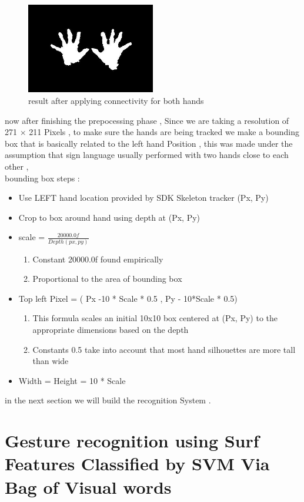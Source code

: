  \begin{figure}[H]
\centering
\includegraphics[width=0.5\textwidth]{img/twohands.jpg}
\caption{result after applying connectivity for both hands  }
\label{fig:twohd}
\end{figure}
now after finishing  the prepocessing phase , Since we are taking a resolution of 271 $\times$ 211 Pixels , to make sure the hands are being tracked we make a bounding box that is basically related to the left hand Position , this was made under the assumption that sign language  usually performed with two hands close to each other , \\
bounding box steps : 
\begin{itemize}
\item  Use LEFT hand location provided by SDK Skeleton  tracker (Px, Py)
 \item Crop to box around hand using depth at (Px, Py)
    \item scale = $\frac{20000.0f}{Depth(px,py)}$ 
    \begin{enumerate}
    \item Constant 20000.0f  found empirically
    \item Proportional to the area of bounding box 
    \end{enumerate}
\item Top left Pixel  = ( Px -10 * Scale * 0.5  , Py - 10*Scale * 0.5)
\begin{enumerate}
    \item This formula scales an initial 10x10 box centered at (Px, Py) to
the appropriate dimensions based on the depth 
    \item Constants 0.5  take into account that most hand
silhouettes are more tall than wide 
    \end{enumerate}
   \item Width = Height = 10 * Scale 
\end{itemize}

in the next section we will build the recognition System  .

\section{ Gesture recognition using Surf Features Classified by SVM  Via Bag of Visual words  }


